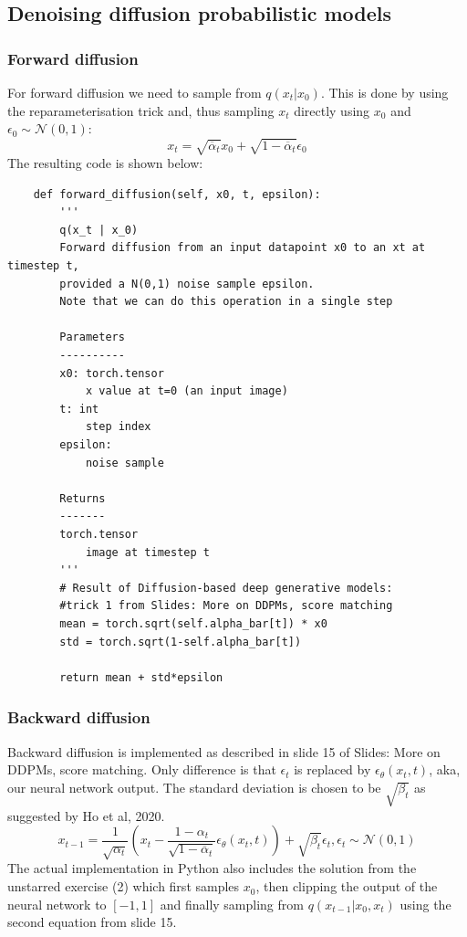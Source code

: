 \subsection{Denoising diffusion probabilistic models}
\subsubsection{Forward diffusion}
For forward diffusion we need to sample from $q(x_t | x_0)$.
This is done by using the reparameterisation trick and, thus sampling $x_t$
directly using $x_0$ and $\epsilon_0 \sim \mathcal{N}(0,1)$:
\begin{equation}
  x_t = \sqrt{\overline{\alpha}_t} x_0 + \sqrt{1-\overline{\alpha}_t} \epsilon_0
\end{equation}
The resulting code is shown below:
\begin{verbatim}
    def forward_diffusion(self, x0, t, epsilon):
        '''
        q(x_t | x_0)
        Forward diffusion from an input datapoint x0 to an xt at timestep t, 
        provided a N(0,1) noise sample epsilon. 
        Note that we can do this operation in a single step

        Parameters
        ----------
        x0: torch.tensor
            x value at t=0 (an input image)
        t: int
            step index 
        epsilon:
            noise sample

        Returns
        -------
        torch.tensor
            image at timestep t
        ''' 
        # Result of Diffusion-based deep generative models: 
        #trick 1 from Slides: More on DDPMs, score matching
        mean = torch.sqrt(self.alpha_bar[t]) * x0
        std = torch.sqrt(1-self.alpha_bar[t])
        
        return mean + std*epsilon
\end{verbatim}

\subsubsection{Backward diffusion}
Backward diffusion is implemented as described in slide 15 of Slides: More on DDPMs, score matching.
Only difference is that $\epsilon_t$ is replaced by $\epsilon_{\theta}(x_t, t)$, aka, our 
neural network output.
The standard deviation is chosen to be $\sqrt{\beta_t}$ as suggested by Ho et al, 2020.
\begin{equation}
  x_{t-1} = \frac{1}{\sqrt{\alpha_t}} \left( x_t - \frac{1-\alpha_t}{\sqrt{1-\overline{\alpha}_t}}
  \epsilon_{\theta}(x_t, t)\right) + \sqrt{\beta_t} \epsilon_{t}, \epsilon_{t} \sim \mathcal{N}(0,1)
\end{equation}
The actual implementation in Python also includes the 
solution from the unstarred exercise (2) which first samples $x_0$, then clipping
the output of the neural network to $[-1,1]$ and finally sampling from $q(x_{t-1} | x_0, x_t)$ using
the second equation from slide 15.

